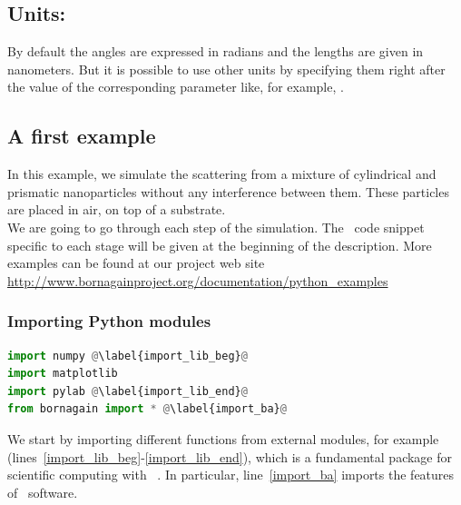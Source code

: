 \subsection{Units:}

By default the angles are expressed in radians and the lengths are given in
nanometers.  But it is possible to use other units by
specifying them right after the value of the corresponding
parameter like, for example, .


\subsection{A first example} \label{sec:Example1Python}

In this example, we simulate the scattering from a mixture of
cylindrical and prismatic nanoparticles without any interference
between them. These particles are placed in air, on top
of a substrate.\\ We are going to go through each step of the
simulation. The \Python\ code snippet specific to each stage will be given at
the beginning of the description.
More examples can be found at our project web site \url{http://www.bornagainproject.org/documentation/python_examples}


\subsubsection{Importing Python modules}

\begin{lstlisting}[language=python, style=eclipseboxed,name=ex1,nolol]
import numpy @\label{import_lib_beg}@
import matplotlib
import pylab @\label{import_lib_end}@
from bornagain import * @\label{import_ba}@
\end{lstlisting}
We start by importing different functions from external
modules, for example  (lines~\ref{import_lib_beg}-\ref{import_lib_end}), which
is a fundamental package for scientific computing with \Python\
\cite{s:numpy}.  In particular, line~\ref{import_ba}
imports the features of \BornAgain\ software.

